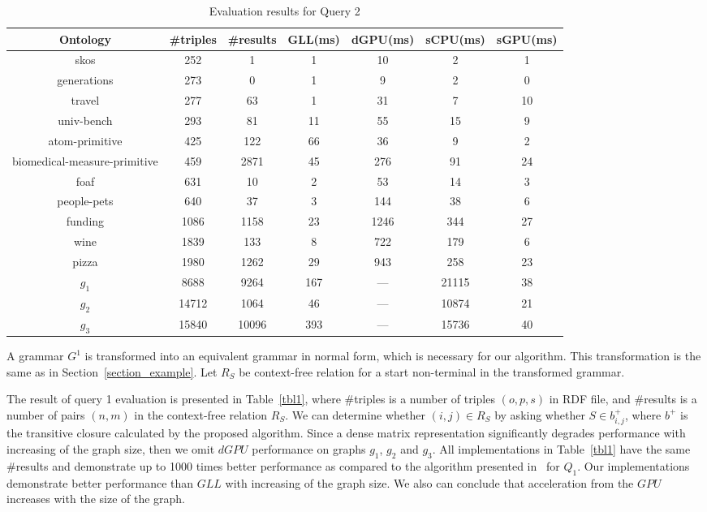 \begin{table*}[h]
\centering
\caption{Evaluation results for Query 2}
\label{tbl2}

\begin{tabular}{ | c | c | c | c | c | c | c |}
\hline
Ontology & \#triples & \#results & GLL(ms) & dGPU(ms) & sCPU(ms) & sGPU(ms) \\
\hline 
\hline
skos        & 252 & 1 & 1 & 10 & 2 & 1\\
generations & 273 & 0 & 1 & 9 & 2 & 0\\
travel      & 277 & 63 & 1 & 31 & 7 & 10\\
univ-bench  & 293 & 81 & 11 & 55 & 15 & 9\\
atom-primitive & 425 & 122 & 66 & 36 & 9 & 2\\
biomedical-measure-primitive & 459 & 2871 & 45 & 276 & 91 & 24\\
foaf        & 631 & 10 & 2 & 53 & 14 & 3\\
people-pets & 640 & 37 & 3 & 144 & 38 & 6\\
funding     & 1086 & 1158 & 23 & 1246 & 344 & 27\\
wine        & 1839 & 133 & 8 & 722 & 179 & 6\\
pizza       & 1980 & 1262 & 29 & 943 & 258 & 23\\
$g_{1}$     & 8688 & 9264 & 167 & --- & 21115 & 38\\
$g_{2}$     & 14712 & 1064 & 46 & --- & 10874 & 21\\
$g_{3}$     & 15840 & 10096 & 393 & --- & 15736 & 40\\
\hline
\end{tabular}

\end{table*}


A grammar $G^1$ is transformed into an equivalent grammar in normal form, which is necessary for our algorithm. This transformation is the same as in Section~\ref{section_example}. Let $R_S$ be context-free relation for a start non-terminal in the transformed grammar.

The result of query 1 evaluation is presented in Table~\ref{tbl1}, where \#triples is a number of triples $(o,p,s)$ in RDF file, and \#results is a number of pairs $(n,m)$ in the context-free relation $R_S$. We can determine whether $(i,j) \in R_S$ by asking whether $S \in b^+_{i,j}$, where $b^+$ is the transitive closure calculated by the proposed algorithm. Since a dense matrix representation significantly degrades performance with increasing of the graph size, then we omit $dGPU$ performance on graphs $g_1$, $g_2$ and $g_3$. All implementations in Table~\ref{tbl1} have the same \#results and demonstrate up to 1000 times better performance as compared to the algorithm presented in~\cite{RDF} for $Q_1$. Our implementations demonstrate better performance than $GLL$ with increasing of the graph size. We also can conclude that acceleration from the $GPU$ increases with the size of the graph.

